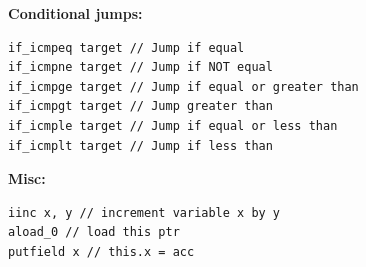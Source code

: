 \textbf{Conditional jumps:}
\begin{lstlisting}[language=JVMIS]
if_icmpeq target // Jump if equal
if_icmpne target // Jump if NOT equal
if_icmpge target // Jump if equal or greater than
if_icmpgt target // Jump greater than
if_icmple target // Jump if equal or less than
if_icmplt target // Jump if less than
\end{lstlisting}
\textbf{Misc:}
\begin{lstlisting}[language=JVMIS]
iinc x, y // increment variable x by y
aload_0 // load this ptr
putfield x // this.x = acc
\end{lstlisting}
